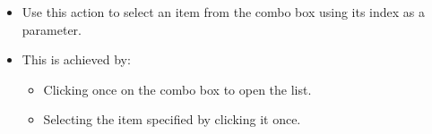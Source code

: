 \begin{itemize}
\item Use this action to select an item from the combo box using its index as a parameter.
\item This is achieved by:
\begin{itemize} 
\item Clicking once on the combo box to open the list.
\item Selecting the item specified by clicking it once.
\end{itemize}
\end{itemize}
